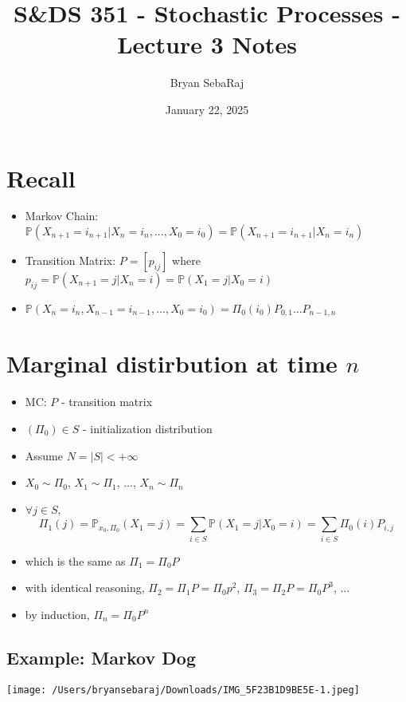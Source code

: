 \documentclass{article}
\title{S\&DS 351 - Stochastic Processes - Lecture 3 Notes}
\author{Bryan SebaRaj}
\date{January 22, 2025}
\begin{document}
\maketitle

\section{Recall}

\begin{itemize}
    \item Markov Chain: $\mathbb{P}(X_{n+1}=i_{n+1} | X_{n}=i_n, ..., X_0 = i_0)=\mathbb{P}(X_{n+1}=i_{n+1} | X_n=i_n)$
\item Transition Matrix: $P = [p_{ij}]$ where $p_{ij} = \mathbb{P}(X_{n+1}=j | X_n=i)=\mathbb{P}(X_1=j | X_0 = i)$
    \item $\mathbb{P}(X_n=i_n, X_{n-1}=i_{n-1}, ... , X_0=i_0)=\Pi_{0}(i_0)P_{0,1} ... P_{n-1,n}$

\end{itemize}

\section{Marginal distirbution at time $n$}

\begin{itemize}
    \item MC: $P$ - transition matrix
    \item $(\Pi_0) \in S$ - initialization distribution
\item Assume $N=|S| < + \infty$
\item $X_0 \sim \Pi_0$, $X_1 \sim \Pi_1$, ..., $X_n \sim \Pi_n$
\item $\forall j \in S$, $$\Pi_1(j)=\mathbb{P}_{x_0, \Pi_0}(X_1 = j) = \sum_{i \in S}\mathbb{P}(X_1=j | X_0 = i) = \sum_{i \in S}\Pi_0 (i)P_{i,j}$$
\item which is the same as $\Pi_1=\Pi_0 P$
\item with identical reasoning, $\Pi_2 = \Pi_1 P=\Pi_0 p^2$, $\Pi_3 = \Pi_2 P = \Pi_0 P^3$, ...
\item by induction, $\Pi_n = \Pi_{0} P^n$
\end{itemize}

\subsection{Example: Markov Dog}

\texttt{[image: /Users/bryansebaraj/Downloads/IMG\_5F23B1D9BE5E-1.jpeg]}
\end{document}
